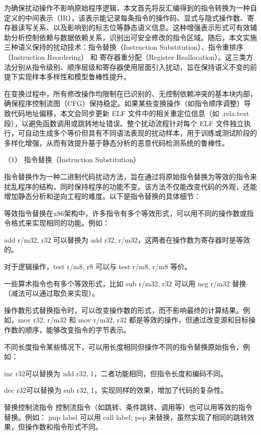 为确保扰动操作不影响原始程序逻辑，本文首先将反汇编得到的指令转换为一种自定义的中间表示（IR），该表示能记录每条指令的操作码、显式与隐式操作数、寄存器读写关系、以及影响到的标志位等静态语义信息。这种增强表示形式可有效辅助分析控制依赖与数据依赖关系，识别出可安全修改的指令区域。随后，本文实施三种语义保持的扰动技术：指令替换（Instruction Substitution）、指令重排序（Instruction Reordering） 和 寄存器重分配（Register Reallocation）。这三类方法分别从指令级别、顺序层级和寄存器使用层面引入扰动，旨在保持语义不变的前提下实现样本多样性和模型鲁棒性提升。

在变换过程中，所有修改操作均限制在已识别的、无控制依赖冲突的基本块内部，确保程序控制流图（CFG）保持稳定。如果某些变换操作（如指令顺序调整）导致代码地址偏移，本文会同步更新 ELF 文件中的相关重定位信息（如 .rela.text 段），以避免函数调用或跳转地址错误。整个扰动流程针对每个 ELF 文件独立执行，可自动生成多个等价但具有不同语法表现的扰动样本，用于训练或测试阶段的多样化增强，从而有效提升基于静态分析的恶意代码检测系统的鲁棒性。

（1） 指令替换（Instruction Substitution）

指令替换作为一种二进制代码扰动方法，旨在通过将原始指令替换为等效的指令来扰乱程序的结构，同时保持程序的功能不变。该方法不仅能改变代码的外观，还能增加静态分析和逆向工程的难度。以下是指令替换的具体细节：

等效指令替换在x86架构中，许多指令有多个等效形式，可以用不同的操作数或指令格式来实现相同的功能。例如：

add r/m32, r32 可以替换为 add r32, r/m32，这两者在操作数为寄存器时是等效的。

对于逻辑操作，test r/m8, r8 可以与 test r/m8, r/m8 等价。

一些算术指令也有多个等效形式，比如 sub r/m32, r32 可以用 neg r/m32 替换（减法可以通过取负来实现）。

操作数形式替换指令时，可以改变操作数的形式，而不影响最终的计算结果。例如，mov r32, r/m32 和 mov r/m32, r32 都是等效的操作，但通过改变源和目标操作数的顺序，能够改变指令的字节表示。

不同长度指令某些情况下，可以用长度相同但操作不同的指令替换原始指令，例如：

inc r32可以替换为 add r32, 1，二者功能相同，但指令长度和编码不同。

dec r32可以替换为 sub r32, 1，实现同样的效果，增加了代码的复杂性。

替换控制流指令 控制流指令（如跳转、条件跳转、调用等）也可以用等效的指令替换。例如：
jmp label 可以用 call label; pop 来替换，虽然实现了相同的跳转效果，但操作数和指令形式不同。


